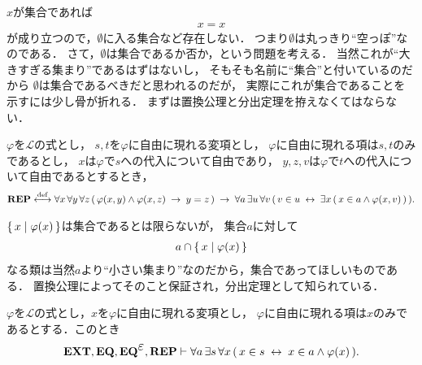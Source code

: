 	$x$が集合であれば
	\begin{align}
		x = x
	\end{align}
	が成り立つので，$\emptyset$に入る集合など存在しない．
	つまり$\emptyset$は丸っきり``空っぽ''なのである．
	さて，$\emptyset$は集合であるか否か，という問題を考える．
	当然これが``大きすぎる集まり''であるはずはないし，
	そもそも名前に``集合''と付いているのだから
	$\emptyset$は集合であるべきだと思われるのだが，
	実際にこれが集合であることを示すには少し骨が折れる．
	まずは置換公理と分出定理を拵えなくてはならない．
	
	\begin{screen}
		\begin{axm}[置換公理]
			$\varphi$を$\mathcal{L}$の式とし，
			$s,t$を$\varphi$に自由に現れる変項とし，
			$\varphi$に自由に現れる項は$s,t$のみであるとし，
			$x$は$\varphi$で$s$への代入について自由であり，
			$y,z,v$は$\varphi$で$t$への代入について自由であるとするとき，
			\begin{align}
				\mbox{{\bf REP}} \overset{\mathrm{def}}{\longleftrightarrow} \forall x\, \forall y\, \forall z\, 
				(\, \varphi(x,y) \wedge \varphi(x,z)
				\hspace{0.25em}\rightarrow\hspace{0.25em} y = z\, )
				\hspace{0.25em}\rightarrow\hspace{0.25em} \forall a\, \exists u\, \forall v\,
				(\, v \in u \hspace{0.25em}\leftrightarrow\hspace{0.25em} \exists x\, (\, x \in a \wedge 
				\varphi(x,v)\, )\, ).
			\end{align}
		\end{axm}
	\end{screen}
	
	$\left\{\, x \mid \varphi(x)\, \right\}$は集合であるとは限らないが，
	集合$a$に対して
	\begin{align}
		a \cap \left\{\, x \mid \varphi(x)\, \right\}
	\end{align}
	なる類は当然$a$より``小さい集まり''なのだから，集合であってほしいものである．
	置換公理によってそのこと保証され，分出定理として知られている．
	
	\begin{screen}
		\begin{thm}[分出定理]\label{thm:axiom_of_separation}
			$\varphi$を$\mathcal{L}$の式とし，$x$を$\varphi$に自由に現れる変項とし，
			$\varphi$に自由に現れる項は$x$のみであるとする．このとき
			\begin{align}
				\EXTAX,\EQAX,\EQAXEP,\REPAX \vdash 
				\forall a\, \exists s\, \forall x\,
				(\, x \in s \lrarrow x \in a \wedge \varphi(x)\, ).
				\label{fom:thm_axiom_of_separation_0}
			\end{align}
		\end{thm}
	\end{screen}
	
